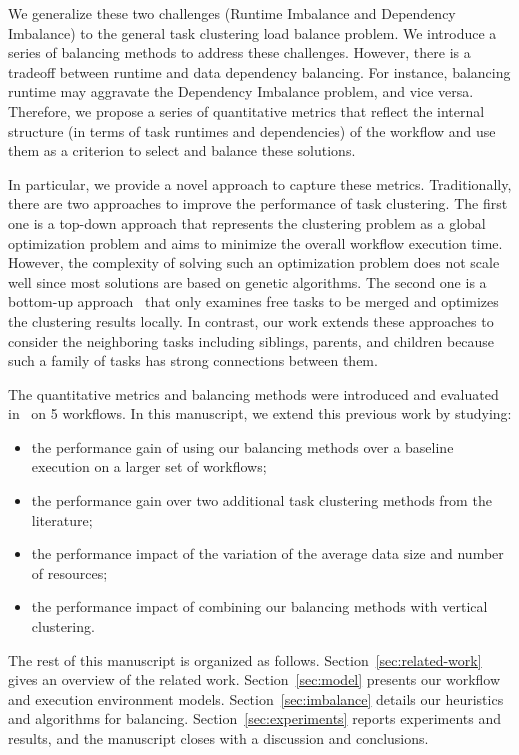 We generalize these two challenges (Runtime Imbalance and Dependency Imbalance) to the general task clustering load balance problem. We introduce a series of balancing methods to address these challenges. However, there is a tradeoff between runtime and data dependency balancing. For instance, balancing runtime may aggravate the Dependency Imbalance problem, and vice versa. Therefore, we propose a series of quantitative metrics that reflect the internal structure (in terms of task runtimes and dependencies) of the workflow and use them as a criterion to select and balance these solutions.

In particular, we provide a novel approach to capture these metrics. Traditionally, there are two approaches to improve the performance of task clustering. The first one is a top-down approach \cite{6217508} that represents the clustering problem as a global optimization problem and aims to minimize the overall workflow execution time. However, the complexity of solving such an optimization problem does not scale well since most solutions are based on genetic algorithms. The second one is a bottom-up approach~\cite{Muthuvelu:2005:DJG:1082290.1082297,Liu2009} that only examines free tasks to be merged and optimizes the clustering results locally. In contrast, our work extends these approaches to consider the neighboring tasks including siblings, parents, and children because such a family of tasks has strong connections between them. 

The quantitative metrics and balancing methods were introduced and evaluated in~\cite{6683907} on 5 workflows. In this manuscript, we extend this previous work by studying:

\begin{itemize}[noitemsep,nolistsep]
	\item the performance gain of using our balancing methods over a baseline execution on a larger set of workflows;
	\item the performance gain over two additional task clustering methods from the literature;
	\item the performance impact of the variation of the average data size and number of resources;
	\item the performance impact of combining our balancing methods with vertical clustering.
\end{itemize}

The rest of this manuscript is organized as follows. Section~\ref{sec:related-work} gives an overview of the related work. Section~\ref{sec:model} presents our workflow and execution environment models. Section~\ref{sec:imbalance} details our heuristics and algorithms for balancing. Section~\ref{sec:experiments} reports experiments and results, and the manuscript closes with a discussion and conclusions.

